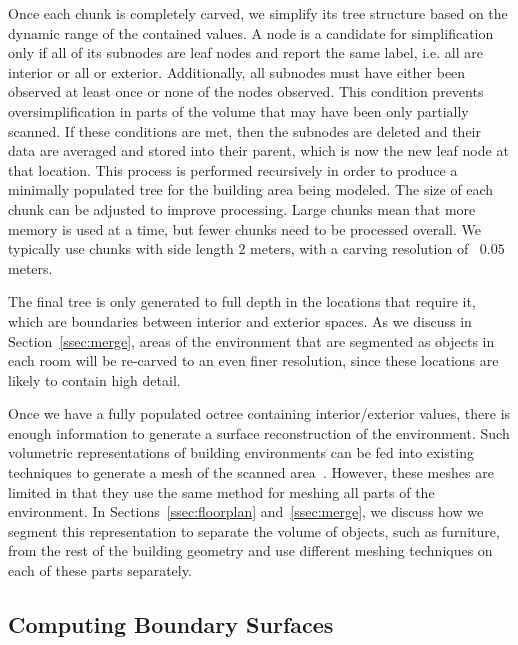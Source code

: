 \documentclass[12pt,onecolumn,oneside]{book}
\begin{document}
Once each chunk is completely carved, we simplify its tree structure based on the dynamic range of the contained values.  A node is a candidate for simplification only if all of its subnodes are leaf nodes and report the same label, i.e. all are interior or all or exterior.  Additionally, all subnodes must have either been observed at least once or none of the nodes observed.  This condition prevents oversimplification in parts of the volume that may have been only partially scanned.  If these conditions are met, then the subnodes are deleted and their data are averaged and stored into their parent, which is now the new leaf node at that location.  This process is performed recursively in order to produce a minimally populated tree for the building area being modeled.  The size of each chunk can be adjusted to improve processing.  Large chunks mean that more memory is used at a time, but fewer chunks need to be processed overall.  We typically use chunks with side length $2$ meters, with a carving resolution of ~$0.05$ meters.

The final tree is only generated to full depth in the locations that require it, which are boundaries between interior and exterior spaces.  As we discuss in Section~\ref{ssec:merge}, areas of the environment that are segmented as objects in each room will be re-carved to an even finer resolution, since these locations are likely to contain high detail.

Once we have a fully populated octree containing interior/exterior values, there is enough information to generate a surface reconstruction of the environment.  Such volumetric representations of building environments can be fed into existing techniques to generate a mesh of the scanned area~\cite{Turner13,Kintinuous,Carving}.  However, these meshes are limited in that they use the same method for meshing all parts of the environment.  In Sections~\ref{ssec:floorplan} and~\ref{ssec:merge}, we discuss how we segment this representation to separate the volume of objects, such as furniture, from the rest of the building geometry and use different meshing techniques on each of these parts separately.

\subsection{Computing Boundary Surfaces}
\label{ssec:procarve_boundary}
\end{document}
